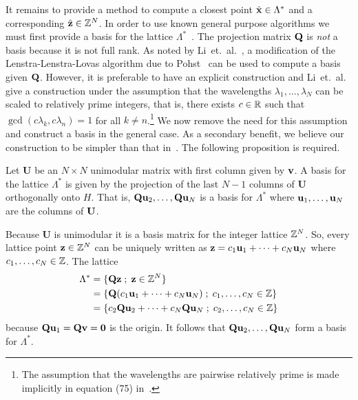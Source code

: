 \documentclass[10pt,twocolumn,twoside]{IEEEtran}
\begin{document}
It remains to provide a method to compute a closest point $\hat{\mathbf{x}} \in \Lambda^*$ and a corresponding $\hat{\mathbf{z}} \in {\mathbb Z}^N$.  In order to use known general purpose algorithms we must first provide a basis for the lattice $\Lambda^*$~\cite{Agrell2002}.  The projection matrix $\mathbf{Q}$ is \emph{not} a basis because it is not full rank.  As noted by Li~et.~al.~\cite{Li_distance_est_wrapped_phase}, a modification of the Lenstra-Lenstra-Lovas algorithm due to Pohst~\cite{Pohst_modified_LLL_reduced_rank_1987} can be used to compute a basis given $\mathbf{Q}$.  However, it is preferable to have an explicit construction and Li~et.~al.~\cite{Li_distance_est_wrapped_phase} give a construction under the assumption that the wavelengths $\lambda_1,\dots,\lambda_N$ can be scaled to relatively prime integers, that is, there exists $c \in {\mathbb R}$ such that $\gcd(c\lambda_k,c\lambda_n) = 1$ for all $k \neq n$.\footnote{The assumption that the wavelengths are pairwise relatively prime is made implicitly in equation (75) in~\cite{Li_distance_est_wrapped_phase}.}  We now remove the need for this assumption and construct a basis in the general case.  As a secondary benefit, we believe our construction to be simpler than that in~\cite{Li_distance_est_wrapped_phase}.  The following proposition is required. 

\begin{proposition}\label{prop:unimodMbasisfinder}
Let $\mathbf{U}$ be an $N \times N$ unimodular matrix with first column given by $\mathbf{v}$.  A basis for the lattice $\Lambda^*$ is given by the projection of the last $N-1$ columns of $\mathbf{U}$ orthogonally onto $H$.  That is, $\mathbf{Q}\mathbf{u}_2, \dots, \mathbf{Q}\mathbf{u}_{N}$ is a basis for $\Lambda^*$ where $\mathbf{u}_1,\dots,\mathbf{u}_{N}$ are the columns of $\mathbf{U}$.
\end{proposition}
\begin{IEEEproof}
Because $\mathbf{U}$ is unimodular it is a basis matrix for the integer lattice ${\mathbb Z}^N$.  So, every lattice point $\mathbf{z} \in {\mathbb Z}^N$ can be uniquely written as $\mathbf{z} = c_1 \mathbf{u}_1 + \dots + c_{N} \mathbf{u}_{N}$ where $c_1,\dots,c_N\in{\mathbb Z}$.  The lattice 
\begin{align*}
\Lambda^* &= \{ \mathbf{Q}\mathbf{z} \; ; \; \mathbf{z} \in {\mathbb Z}^N \} \\
&= \{ \mathbf{Q} (c_1 \mathbf{u}_1 + \dots + c_{N} \mathbf{u}_{N})  \; ; \; c_1,\dots,c_N\in{\mathbb Z} \} \\
&= \{ c_2 \mathbf{Q}\mathbf{u}_2 + \dots + c_{N} \mathbf{Q}\mathbf{u}_{N}  \; ; \; c_{2},\dots,c_{N}\in{\mathbb Z} \}
\end{align*}
because $\mathbf{Q}\mathbf{u}_1 = \mathbf{Q}\mathbf{v} = \boldsymbol{0}$ is the origin.  It follows that $\mathbf{Q}\mathbf{u}_2,\dots,\mathbf{Q}\mathbf{u}_{N}$ form a basis for $\Lambda^*$.
\end{IEEEproof}
\end{document}
